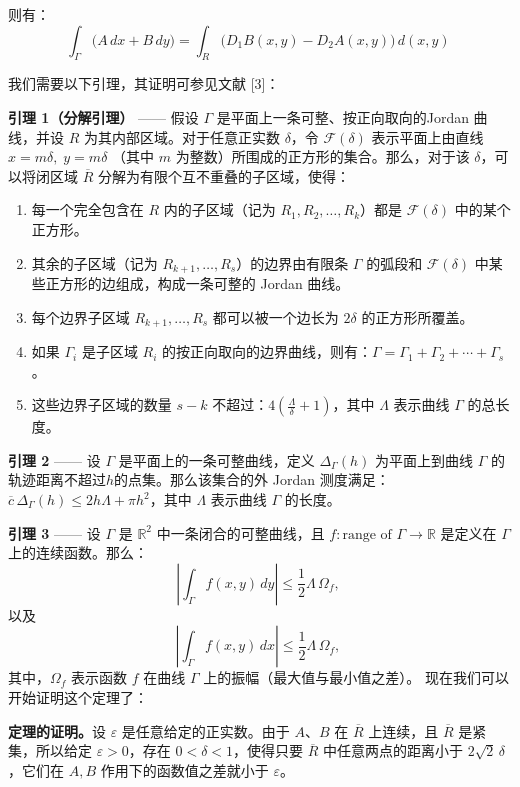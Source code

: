 则有：
$$
\int_{\Gamma} \big( A\,dx + B\,dy \big)
= 
\int_{R} \big( D_1 B(x, y) - D_2 A(x, y) \big) \, d(x, y)~
$$

我们需要以下引理，其证明可参见文献 [3]：

\textbf{引理 1（分解引理）} —— 假设 $\Gamma$ 是平面上一条可整、按正向取向的Jordan 曲线，并设 $R$ 为其内部区域。对于任意正实数 $\delta$，令 $\mathcal{F}(\delta)$ 表示平面上由直线$x = m\delta,\; y = m\delta$
（其中 $m$ 为整数）所围成的正方形的集合。那么，对于该 $\delta$，可以将闭区域 $\overline{R}$ 分解为有限个互不重叠的子区域，使得：
\begin{enumerate}
\item 每一个完全包含在 $R$ 内的子区域（记为 $R_1, R_2, \ldots, R_k$）都是 $\mathcal{F}(\delta)$ 中的某个正方形。
\item 其余的子区域（记为 $R_{k+1}, \ldots, R_s$）的边界由有限条 $\Gamma$ 的弧段和 $\mathcal{F}(\delta)$ 中某些正方形的边组成，构成一条可整的 Jordan 曲线。
\item 每个边界子区域 $R_{k+1}, \ldots, R_s$ 都可以被一个边长为 $2\delta$ 的正方形所覆盖。
\item 如果 $\Gamma_i$ 是子区域 $R_i$ 的按正向取向的边界曲线，则有：$\Gamma = \Gamma_1 + \Gamma_2 + \cdots + \Gamma_s$。
\item 这些边界子区域的数量 $s-k$ 不超过：$4\left(\frac{\Lambda}{\delta} + 1\right)$，其中 $\Lambda$ 表示曲线 $\Gamma$ 的总长度。
\end{enumerate}
\textbf{引理 2} —— 设 $\Gamma$ 是平面上的一条可整曲线，定义 $\Delta_{\Gamma}(h)$ 为平面上到曲线 $\Gamma$ 的轨迹距离不超过$h$的点集。那么该集合的外 Jordan 测度满足：$\overline{c}\,\Delta_{\Gamma}(h) \leq 2h\Lambda + \pi h^2$，其中 $\Lambda$ 表示曲线 $\Gamma$ 的长度。

\textbf{引理 3} —— 设 $\Gamma$ 是 $\mathbb{R}^2$ 中一条闭合的可整曲线，且 $f : \text{range of } \Gamma \to \mathbb{R}$ 是定义在 $\Gamma$ 上的连续函数。那么：
$$
\left| \int_{\Gamma} f(x, y)\, dy \right| \leq \frac{1}{2} \Lambda \, \Omega_f,~
$$
以及
$$
\left| \int_{\Gamma} f(x, y)\, dx \right| \leq \frac{1}{2} \Lambda \, \Omega_f,~
$$
其中，$\Omega_f$ 表示函数 $f$ 在曲线 $\Gamma$ 上的振幅（最大值与最小值之差）。
现在我们可以开始证明这个定理了：

\textbf{定理的证明。}设 $\varepsilon$ 是任意给定的正实数。由于 $A$、$B$ 在 $\overline{R}$ 上连续，且 $\overline{R}$ 是紧集，所以给定 $\varepsilon > 0$，存在 $0 < \delta < 1$，使得只要 $\overline{R}$ 中任意两点的距离小于 $2\sqrt{2}\,\delta$，它们在 $A,B$ 作用下的函数值之差就小于 $\varepsilon$。

